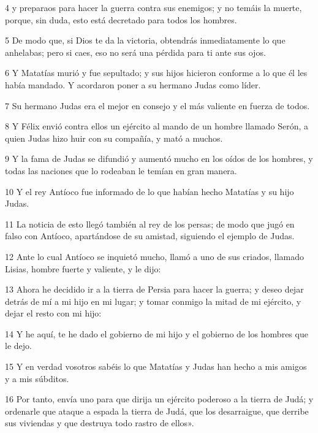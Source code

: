 \par 4 y preparaos para hacer la guerra contra sus enemigos; y no temáis la muerte, porque, sin duda, esto está decretado para todos los hombres.

\par 5 De modo que, si Dios te da la victoria, obtendrás inmediatamente lo que anhelabas; pero si caes, eso no será una pérdida para ti ante sus ojos.

\par 6 Y Matatías murió y fue sepultado; y sus hijos hicieron conforme a lo que él les había mandado. Y acordaron poner a su hermano Judas como líder.

\par 7 Su hermano Judas era el mejor en consejo y el más valiente en fuerza de todos.

\par 8 Y Félix envió contra ellos un ejército al mando de un hombre llamado Serón, a quien Judas hizo huir con su compañía, y mató a muchos.

\par 9 Y la fama de Judas se difundió y aumentó mucho en los oídos de los hombres, y todas las naciones que lo rodeaban le temían en gran manera.

\par 10 Y el rey Antíoco fue informado de lo que habían hecho Matatías y su hijo Judas.

\par 11 La noticia de esto llegó también al rey de los persas; de modo que jugó en falso con Antíoco, apartándose de su amistad, siguiendo el ejemplo de Judas.

\par 12 Ante lo cual Antíoco se inquietó mucho, llamó a uno de sus criados, llamado Lisias, hombre fuerte y valiente, y le dijo:

\par 13 Ahora he decidido ir a la tierra de Persia para hacer la guerra; y deseo dejar detrás de mí a mi hijo en mi lugar; y tomar conmigo la mitad de mi ejército, y dejar el resto con mi hijo:

\par 14 Y he aquí, te he dado el gobierno de mi hijo y el gobierno de los hombres que le dejo.

\par 15 Y en verdad vosotros sabéis lo que Matatías y Judas han hecho a mis amigos y a mis súbditos.

\par 16 Por tanto, envía uno para que dirija un ejército poderoso a la tierra de Judá; y ordenarle que ataque a espada la tierra de Judá, que los desarraigue, que derribe sus viviendas y que destruya todo rastro de ellos».

